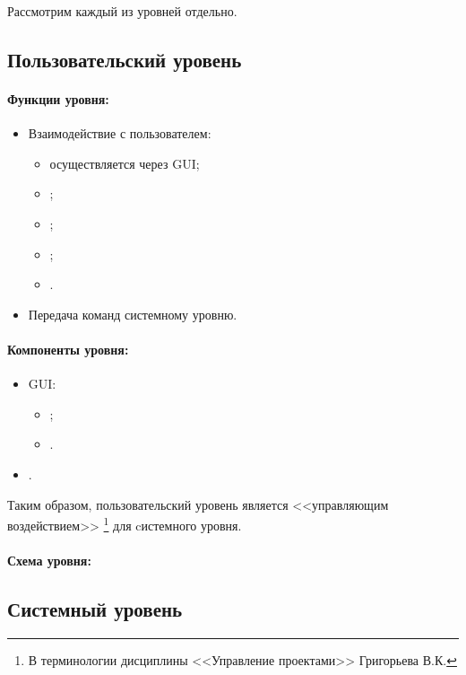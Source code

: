 \documentclass[12pt,a4paper,fullpage,titlepage]{article}
\begin{document}
Рассмотрим каждый из уровней отдельно.

\newpage
\subsection{Пользовательский уровень}

\paragraph{Функции уровня:}
\begin{itemize}
	\item Взаимодействие с пользователем:
	\begin{itemize}
		\item осуществляется через GUI;
		\item ;
		\item ;
		\item ;
		\item .
	\end{itemize}
	\item Передача команд системному уровню.\\
\end{itemize}

\paragraph{Компоненты уровня:}
\begin{itemize}
	\item GUI:
	\begin{itemize}
		\item ;
		\item .
	\end{itemize}
	\item .\\
\end{itemize}

Таким образом, пользовательский уровень является <<управляющим воздействием>> \footnote{В терминологии дисциплины <<Управление проектами>> Григорьева В.К.} для cистемного уровня.\\

\paragraph{Схема уровня:}

\newpage
\subsection{Системный уровень}
\end{document}
